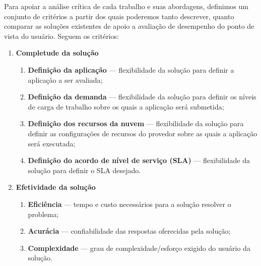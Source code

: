 Para apoiar a análise crítica de cada trabalho e suas abordagens, definimos um conjunto de critérios a partir dos quais poderemos tanto descrever, quanto comparar as soluções existentes de apoio a avaliação de desempenho do ponto de vista do usuário. Seguem os critérios:

\begin{enumerate}
  \item \textbf{Completude da solução}
  \begin{enumerate}
    \item \textbf{Definição da aplicação} --- flexibilidade da solução para
    definir a aplicação a ser avaliada;
    \item \textbf{Definição da demanda} --- flexibilidade da solução para
    definir os níveis de carga de trabalho sobre os quais a aplicação será
    submetida;
	\item \textbf{Definição dos recursos da nuvem} --- flexibilidade da solução
	para definir as configurações de recursos do provedor sobre as quais a aplicação
	será executada;
	\item \textbf{Definição do acordo de nível de serviço (SLA)} --- flexibilidade
	da solução para definir o SLA desejado.
  \end{enumerate}
  \item \textbf{Efetividade da solução}  
  \begin{enumerate}
    \item \textbf{Eficiência} --- tempo e custo necessários para a solução
    resolver o problema;
    \item \textbf{Acurácia} --- confiabilidade das respostas oferecidas pela
    solução;
	\item \textbf{Complexidade} --- grau de complexidade/esforço exigido do usuário
	da solução.
  \end{enumerate}
\end{enumerate}


